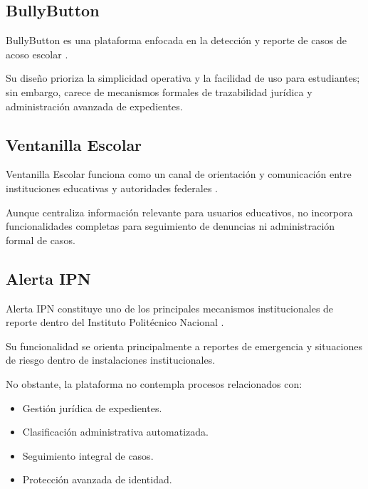 \subsection{BullyButton}

\begin{flushleft}
\justifying

BullyButton es una plataforma enfocada en la detección y reporte de casos de acoso escolar \cite{21}.

Su diseño prioriza la simplicidad operativa y la facilidad de uso para estudiantes; sin embargo, carece de mecanismos formales de trazabilidad jurídica y administración avanzada de expedientes.

\end{flushleft}

\subsection{Ventanilla Escolar}

\begin{flushleft}
\justifying

Ventanilla Escolar funciona como un canal de orientación y comunicación entre instituciones educativas y autoridades federales \cite{22}.

Aunque centraliza información relevante para usuarios educativos, no incorpora funcionalidades completas para seguimiento de denuncias ni administración formal de casos.

\end{flushleft}

\subsection{Alerta IPN}

\begin{flushleft}
\justifying

Alerta IPN constituye uno de los principales mecanismos institucionales de reporte dentro del Instituto Politécnico Nacional \cite{23}.

Su funcionalidad se orienta principalmente a reportes de emergencia y situaciones de riesgo dentro de instalaciones institucionales.

No obstante, la plataforma no contempla procesos relacionados con:

\begin{itemize}

    \item Gestión jurídica de expedientes.
    \item Clasificación administrativa automatizada.
    \item Seguimiento integral de casos.
    \item Protección avanzada de identidad.

\end{itemize}

\end{flushleft}

